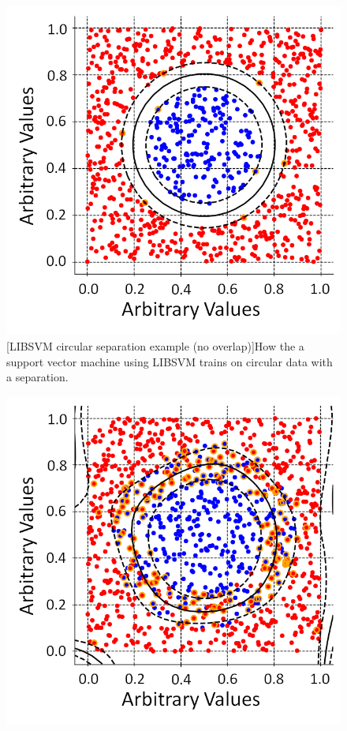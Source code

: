 \begin{figure}[!h]
\centering
\begin{minipage}{.45\textwidth}
  \centering
  \includegraphics[width=\linewidth]{Chapter4/Figs/adjustedSvmPlots/adjusted_CircleSepExample.png}
  [LIBSVM circular separation example (no overlap)]{How the a support vector machine using LIBSVM trains on circular data with a separation.} 
  \label{fig:CircleSepExample}
\end{minipage}%
\qquad
\begin{minipage}{.45\textwidth}
  \centering
  \includegraphics[width=\linewidth]{Chapter4/Figs/adjustedSvmPlots/adjusted_CircleNoSepExample.png}

\end{minipage}
\end{figure}
